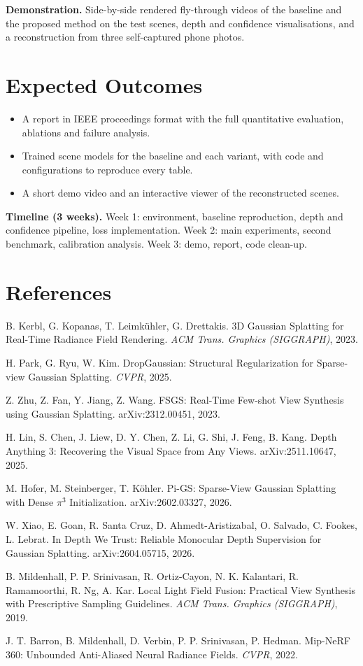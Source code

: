 \documentclass[11pt,a4paper]{article}
\begin{document}
\textbf{Demonstration.} Side-by-side rendered fly-through videos of the baseline and the proposed method on the test scenes, depth and confidence visualisations, and a reconstruction from three self-captured phone photos.

\section{Expected Outcomes}

\begin{itemize}
\item A report in IEEE proceedings format with the full quantitative evaluation, ablations and failure analysis.
\item Trained scene models for the baseline and each variant, with code and configurations to reproduce every table.
\item A short demo video and an interactive viewer of the reconstructed scenes.
\end{itemize}

\textbf{Timeline (3 weeks).} Week 1: environment, baseline reproduction, depth and confidence pipeline, loss implementation. Week 2: main experiments, second benchmark, calibration analysis. Week 3: demo, report, code clean-up.

\section*{References}
\small
\begin{enumerate}[label={[\arabic*]},leftmargin=2em]
\item B. Kerbl, G. Kopanas, T. Leimk\"uhler, G. Drettakis. 3D Gaussian Splatting for Real-Time Radiance Field Rendering. \emph{ACM Trans. Graphics (SIGGRAPH)}, 2023.
\item H. Park, G. Ryu, W. Kim. DropGaussian: Structural Regularization for Sparse-view Gaussian Splatting. \emph{CVPR}, 2025.
\item Z. Zhu, Z. Fan, Y. Jiang, Z. Wang. FSGS: Real-Time Few-shot View Synthesis using Gaussian Splatting. arXiv:2312.00451, 2023.
\item H. Lin, S. Chen, J. Liew, D. Y. Chen, Z. Li, G. Shi, J. Feng, B. Kang. Depth Anything 3: Recovering the Visual Space from Any Views. arXiv:2511.10647, 2025.
\item M. Hofer, M. Steinberger, T. K\"ohler. Pi-GS: Sparse-View Gaussian Splatting with Dense $\pi^3$ Initialization. arXiv:2602.03327, 2026.
\item W. Xiao, E. Goan, R. Santa Cruz, D. Ahmedt-Aristizabal, O. Salvado, C. Fookes, L. Lebrat. In Depth We Trust: Reliable Monocular Depth Supervision for Gaussian Splatting. arXiv:2604.05715, 2026.
\item B. Mildenhall, P. P. Srinivasan, R. Ortiz-Cayon, N. K. Kalantari, R. Ramamoorthi, R. Ng, A. Kar. Local Light Field Fusion: Practical View Synthesis with Prescriptive Sampling Guidelines. \emph{ACM Trans. Graphics (SIGGRAPH)}, 2019.
\item J. T. Barron, B. Mildenhall, D. Verbin, P. P. Srinivasan, P. Hedman. Mip-NeRF 360: Unbounded Anti-Aliased Neural Radiance Fields. \emph{CVPR}, 2022.
\end{enumerate}
\end{document}
